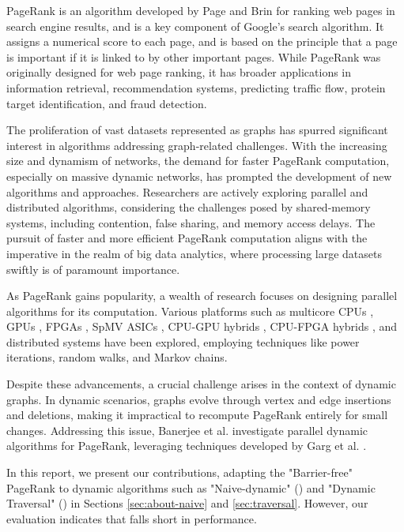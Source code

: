 PageRank is an algorithm developed by Page and Brin \cite{rank-page99} for ranking web pages in search engine results, and is a key component of Google's search algorithm. It assigns a numerical score to each page, and is based on the principle that a page is important if it is linked to by other important pages. While PageRank was originally designed for web page ranking, it has broader applications in information retrieval, recommendation systems, predicting traffic flow, protein target identification, and fraud detection.

The proliferation of vast datasets represented as graphs has spurred significant interest in algorithms addressing graph-related challenges. With the increasing size and dynamism of networks, the demand for faster PageRank computation, especially on massive dynamic networks, has prompted the development of new algorithms and approaches. Researchers are actively exploring parallel and distributed algorithms, considering the challenges posed by shared-memory systems, including contention, false sharing, and memory access delays. The pursuit of faster and more efficient PageRank computation aligns with the imperative in the realm of big data analytics, where processing large datasets swiftly is of paramount importance.

As PageRank gains popularity, a wealth of research focuses on designing parallel algorithms for its computation. Various platforms such as multicore CPUs \cite{rank-garg16}, GPUs \cite{rapids}, FPGAs \cite{rank-guoqiang20}, SpMV ASICs \cite{rank-sadi18}, CPU-GPU hybrids \cite{rank-giri20}, CPU-FPGA hybrids \cite{rank-li21}, and distributed systems \cite{rank-sarma13} have been explored, employing techniques like power iterations, random walks, and Markov chains.

Despite these advancements, a crucial challenge arises in the context of dynamic graphs. In dynamic scenarios, graphs evolve through vertex and edge insertions and deletions, making it impractical to recompute PageRank entirely for small changes. Addressing this issue, Banerjee et al. \cite{rank-sahu22} investigate parallel dynamic algorithms for PageRank, leveraging techniques developed by Garg et al. \cite{rank-garg16}.

In this report, we present our contributions, adapting the "Barrier-free" PageRank to dynamic algorithms such as "Naive-dynamic" (\NaiBarf{}) and "Dynamic Traversal" (\TraBarf{}) in Sections \ref{sec:about-naive} and \ref{sec:traversal}. However, our evaluation indicates that \TraBarf{} falls short in performance.




